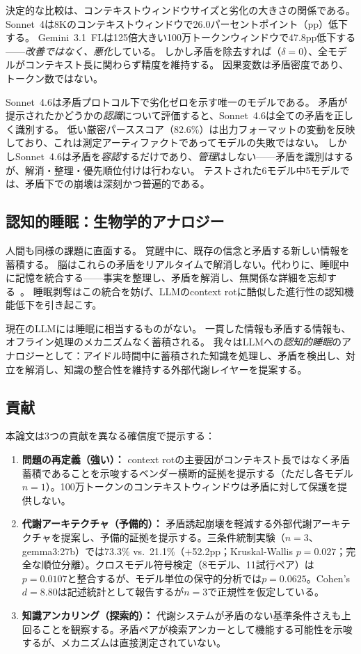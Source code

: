 \documentclass[11pt,a4paper]{article}
\begin{document}
決定的な比較は、コンテキストウィンドウサイズと劣化の大きさの関係である。
Sonnet~4は8Kのコンテキストウィンドウで26.0パーセントポイント（pp）低下する。
Gemini~3.1~FLは125倍大きい100万トークンウィンドウで47.8pp低下する——\emph{改善ではなく、悪化}している。
しかし矛盾を除去すれば（$\delta = 0$）、全モデルがコンテキスト長に関わらず精度を維持する。
因果変数は矛盾密度であり、トークン数ではない。

Sonnet~4.6は矛盾プロトコル下で劣化ゼロを示す唯一のモデルである。
矛盾が提示されたかどうかの\emph{認識}について評価すると、Sonnet~4.6は全ての矛盾を正しく識別する。
低い厳密パーススコア（82.6\%）は出力フォーマットの変動を反映しており、これは測定アーティファクトであってモデルの失敗ではない。
しかしSonnet~4.6は矛盾を\emph{容認}するだけであり、\emph{管理}はしない——矛盾を識別はするが、解消・整理・優先順位付けは行わない。
テストされた6モデル中5モデルでは、矛盾下での崩壊は深刻かつ普遍的である。

\subsection{認知的睡眠：生物学的アナロジー}

人間も同様の課題に直面する。
覚醒中に、既存の信念と矛盾する新しい情報を蓄積する。
脳はこれらの矛盾をリアルタイムで解消しない。代わりに、睡眠中に記憶を統合する——事実を整理し、矛盾を解消し、無関係な詳細を忘却する~\citep{walker2017sleep,stickgold2005sleep}。
睡眠剥奪はこの統合を妨げ、LLMのcontext rotに酷似した進行性の認知機能低下を引き起こす。

現在のLLMには睡眠に相当するものがない。
一貫した情報も矛盾する情報も、オフライン処理のメカニズムなく蓄積される。
我々はLLMへの\emph{認知的睡眠}のアナロジーとして：アイドル時間中に蓄積された知識を処理し、矛盾を検出し、対立を解消し、知識の整合性を維持する外部代謝レイヤーを提案する。

\subsection{貢献}

本論文は3つの貢献を異なる確信度で提示する：

\begin{enumerate}
\item \textbf{問題の再定義（強い）：} context rotの主要因がコンテキスト長ではなく矛盾蓄積であることを示唆するベンダー横断的証拠を提示する（ただし各モデル$n = 1$）。100万トークンのコンテキストウィンドウは矛盾に対して保護を提供しない。
\item \textbf{代謝アーキテクチャ（予備的）：} 矛盾誘起崩壊を軽減する外部代謝アーキテクチャを提案し、予備的証拠を提示する。三条件統制実験（$n = 3$、gemma3:27b）では73.3\% vs.\ 21.1\%（$+$52.2pp；Kruskal-Wallis $p = 0.027$；完全な順位分離）。クロスモデル符号検定（8モデル、11試行ペア）は$p = 0.0107$と整合するが、モデル単位の保守的分析では$p = 0.0625$。Cohen's $d = 8.80$は記述統計として報告するが$n = 3$で正規性を仮定している。
\item \textbf{知識アンカリング（探索的）：} 代謝システムが矛盾のない基準条件さえも上回ることを観察する。矛盾ペアが検索アンカーとして機能する可能性を示唆するが、メカニズムは直接測定されていない。
\end{enumerate}
\end{document}
